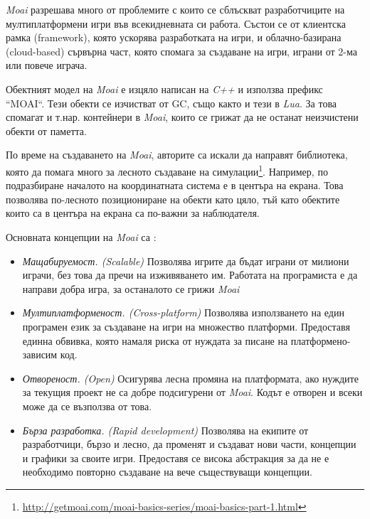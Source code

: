 		\emph{Moai} разрешава много от проблемите с които се сблъскват разработчиците на мултиплатформени 
		игри във всекидневната си работа. Състои се от клиентска рамка (framework), която ускорява разработката
		на игри, и облачно-базирана (cloud-based) сървърна част, която спомага за създаване на игри, играни от 2-ма
		или повече играча.

		Обектният модел на \emph{Moai} е изцяло написан на \emph{C++} и използва префикс ``MOAI``. Тези обекти
		се изчистват от \ac{GC}, също както и тези в \emph{Lua}. За това спомагат и т.нар. контейнери в \emph{Moai},
		които се грижат да не останат неизчистени обекти от паметта.
		
		По време на създаването на \emph{Moai}, авторите са искали да направят библиотека, която да помага много
		за лесното създаване на симулации\footnote{\url{http://getmoai.com/moai-basics-series/moai-basics-part-1.html}}.
		Например, по подразбиране началото на координатната система е в центъра на екрана. Това позволява по-лесното
		позициониране на обекти като цяло, тъй като обектите които са в центъра на екрана са по-важни за наблюдателя.
		
		Основната концепции на \emph{Moai} са \cite{Zipline}:
		
		\begin{itemize}

			\item \emph{Мащабируемост. (Scalable)} Позволява игрите да бъдат играни от милиони играчи, без това
			да пречи на изживяването им. Работата на програмиста е да направи добра игра, за останалото се грижи
			\emph{Moai} 
			
			\item \emph{Мултиплатформеност. (Cross-platform)} Позволява използването на един програмен език за
			създаване на игри на множество платформи. Предоставя единна обвивка, която намаля риска от нуждата за
			писане на платформено-зависим код.
			
			\item \emph{Отвореност. (Open)} Осигурява лесна промяна на платформата, ако нуждите за текущия
			проект не са добре подсигурени от \emph{Moai}. Кодът е отворен и всеки може да се възползва от това.
			
			\item \emph{Бърза разработка. (Rapid development)} Позволява на екипите от разработчици, бързо и лесно, да
			променят и създават нови части, концепции и графики за своите игри. Предоставя се висока абстракция за да не е
			необходимо повторно създаване на вече съществуващи концепции.
			
		\end{itemize}
		
